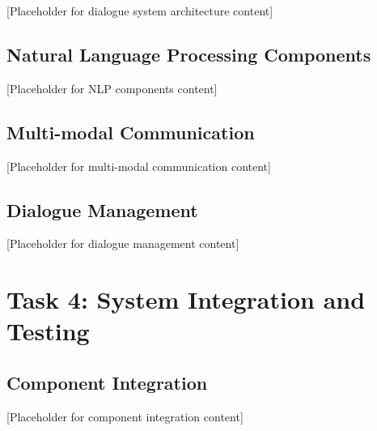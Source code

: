 \documentclass[12pt,a4paper]{article}
\begin{document}
[Placeholder for dialogue system architecture content]

\subsection{Natural Language Processing Components}


[Placeholder for NLP components content]

\subsection{Multi-modal Communication}


[Placeholder for multi-modal communication content]

\subsection{Dialogue Management}


[Placeholder for dialogue management content]

\section{Task 4: System Integration and Testing}


\subsection{Component Integration}


[Placeholder for component integration content]
\end{document}
